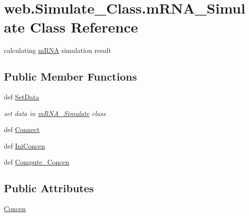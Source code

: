 \hypertarget{classweb_1_1_simulate___class_1_1m_r_n_a___simulate}{\section{web.\-Simulate\-\_\-\-Class.\-m\-R\-N\-A\-\_\-\-Simulate Class Reference}
\label{classweb_1_1_simulate___class_1_1m_r_n_a___simulate}
}


calculating \hyperlink{classm_r_n_a}{m\-R\-N\-A} simulation result  


\subsection*{Public Member Functions}
\begin{DoxyCompactItemize}
\item 
def \hyperlink{classweb_1_1_simulate___class_1_1m_r_n_a___simulate_aafa306e52e6cd8565e2abc96336bacbf}{Set\-Data}
\begin{DoxyCompactList}\small\item\em set data in \hyperlink{classweb_1_1_simulate___class_1_1m_r_n_a___simulate}{m\-R\-N\-A\-\_\-\-Simulate} class \end{DoxyCompactList}\item 
def \hyperlink{classweb_1_1_simulate___class_1_1m_r_n_a___simulate_a4af7cedb8c3df5fcd581affc57e7afca}{Connect}
\item 
def \hyperlink{classweb_1_1_simulate___class_1_1m_r_n_a___simulate_a8b9036fb94041c3247f18ab5b7d28216}{Ini\-Concen}
\item 
def \hyperlink{classweb_1_1_simulate___class_1_1m_r_n_a___simulate_ab96aa173aa7a27b60a60c3cddc05b41b}{Compute\-\_\-\-Concen}
\end{DoxyCompactItemize}
\subsection*{Public Attributes}
\begin{DoxyCompactItemize}
\item 
\hyperlink{classweb_1_1_simulate___class_1_1m_r_n_a___simulate_a89a68a9662a7c802b3b9d7436649920f}{Concen}
\end{DoxyCompactItemize}
